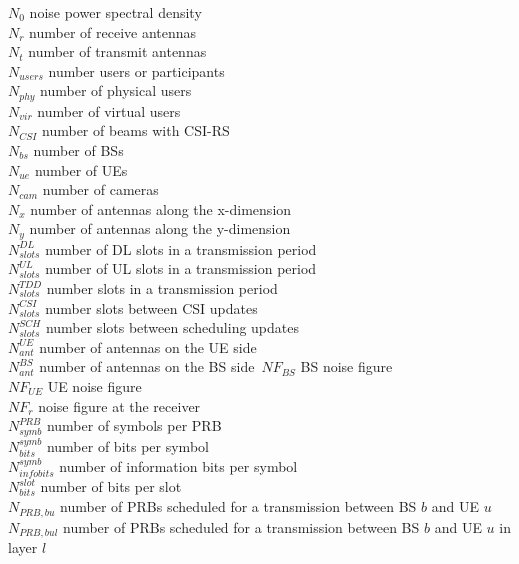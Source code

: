 $N_0$ \mytab noise power spectral density \\
$N_r$ \mytab number of receive antennas \\
$N_t$ \mytab number of transmit antennas \\
$N_{users}$ \mytab number users or participants \\
$N_{phy}$ \mytab number of physical users \\
$N_{vir}$ \mytab number of virtual users \\
$N_{CSI}$ \mytab number of beams with CSI-RS\\
$N_{bs}$ \mytab number of \acsp{BS} \\
$N_{ue}$ \mytab number of \acsp{UE} \\
$N_{cam}$ \mytab number of cameras \\
$N_x$ \mytab number of antennas along the x-dimension\\
$N_y$ \mytab number of antennas along the y-dimension\\
$N^{DL}_{slots}$ \mytab number of \acs{DL} slots in a transmission period\\
$N^{UL}_{slots}$ \mytab number of \acs{UL} slots in a transmission period\\
$N^{TDD}_{slots}$ \mytab number slots in a transmission period\\
$N^{CSI}_{slots}$ \mytab number slots between \acs{CSI} updates\\
$N^{SCH}_{slots}$ \mytab number slots between scheduling updates\\
$N_{ant}^{UE}$ \mytab number of antennas on the \acs{UE} side\\
$N_{ant}^{BS}$ \mytab number of antennas on the \acs{BS} side\
$NF_{BS}$ \mytab BS noise figure \\
$NF_{UE}$ \mytab UE noise figure\\
$NF_{r}$ \mytab noise figure at the receiver\\


$N_{symb}^{PRB}$ \mytab number of symbols per PRB \\
$N_{bits}^{symb}$ \mytab number of bits per symbol \\
$N_{info bits}^{symb}$ \mytab number of information bits per symbol \\
$N_{bits}^{slot}$ \mytab number of bits per slot \\
$N_{PRB, bu}$ \mytab number of PRBs scheduled for a transmission between BS $b$ and UE $u$ \\
$N_{PRB, bul}$ \mytab number of PRBs scheduled for a transmission between BS $b$ and UE $u$ in layer $l$\\

